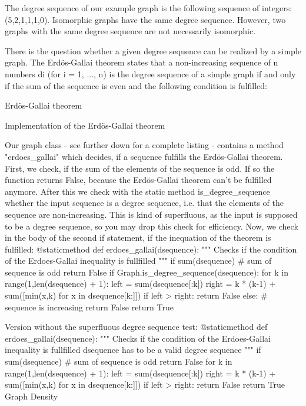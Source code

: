 The degree sequence of our example graph is the following sequence of integers: (5,2,1,1,1,0). 
Isomorphic graphs have the same degree sequence. However, two graphs with the same degree sequence are not necessarily isomorphic. 

There is the question whether a given degree sequence can be realized by a simple graph. The Erdös-Gallai theorem states that a non-increasing sequence of n numbers di (for i = 1, ..., n) is the degree sequence of a simple graph if and only if the sum of the sequence is even and the following condition is fulfilled: 

Erdös-Gallai theorem 

Implementation of the Erdös-Gallai theorem

Our graph class - see further down for a complete listing - contains a method "erdoes_gallai" which decides, if a sequence fulfills the Erdös-Gallai theorem. First, we check, if the sum of the elements of the sequence is odd. If so the function returns False, because the Erdös-Gallai theorem can't be fulfilled anymore. After this we check with the static method is_degree_sequence whether the input sequence is a degree sequence, i.e. that the elements of the sequence are non-increasing. This is kind of superfluous, as the input is supposed to be a degree sequence, so you may drop this check for efficiency. Now, we check in the body of the second if statement, if the inequation of the theorem is fulfilled:
    @staticmethod
    def erdoes_gallai(dsequence):
        """ Checks if the condition of the Erdoes-Gallai inequality 
            is fullfilled 
        """
        if sum(dsequence) %
            # sum of sequence is odd
            return False
        if Graph.is_degree_sequence(dsequence):
            for k in range(1,len(dsequence) + 1):
                left = sum(dsequence[:k])
                right =  k * (k-1) + sum([min(x,k) for x in dsequence[k:]])
                if left > right:
                    return False
        else:
            # sequence is increasing
            return False
        return True


Version without the superfluous degree sequence test:
    @staticmethod
    def erdoes_gallai(dsequence):
        """ Checks if the condition of the Erdoes-Gallai inequality 
            is fullfilled 
            dsequence has to be a valid degree sequence
        """
        if sum(dsequence) %
            # sum of sequence is odd
            return False
        for k in range(1,len(dsequence) + 1):
            left = sum(dsequence[:k])
            right =  k * (k-1) + sum([min(x,k) for x in dsequence[k:]])
            if left > right:
                return False
        return True
Graph Density

